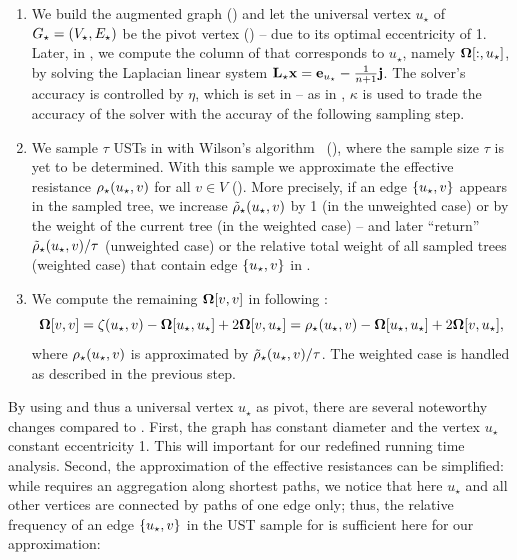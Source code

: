 \begin{enumerate}
\item We build the augmented graph \gstar
    () and let the universal vertex $u_\star$ of
    $G_{\star} = (V_\star, E_\star)$ be the pivot vertex ()
    -- due to its optimal eccentricity of 1. Later, in
    , we compute the column of \Fmat that
    corresponds to $u_\star$, namely $\bm{\Omega}[:, u_\star]$, by solving the
    Laplacian linear system
    $\mathbf{L_{\star}}\mathbf{x} = \mathbf{e}_{u_\star} - \frac{1}{n + 1}\mathbf{j}$.
    The solver's accuracy is controlled by $\eta$, which is set in
     -- as in ,
    $\kappa$ is used to trade the accuracy of the solver with the accuray of
    the following sampling step.

\item We sample $\tau$ USTs in \gstar with Wilson's algorithm~\cite{DBLP:conf/stoc/Wilson96}
    (), where the sample size $\tau$ is yet to be determined.
    With this sample we approximate the effective resistance $\rho_{\star}(u_\star, v)$
    for all $v\in V$
    ().
    More precisely, if an edge $\set{u_\star, v}$ appears in the sampled tree, we increase
    $\tilde{\rho}_{\star}(u_\star, v)$ by 1 (in the unweighted case) or by the weight of the current
    tree (in the weighted case) -- and later \enquote{return}
    $\tilde{\rho}_{\star}(u_\star, v)/\tau$ (unweighted case) or the relative total weight of all
    sampled trees (weighted case) that contain edge $\set{u_\star, v}$ in
    .

\item We compute the remaining $\bm{\Omega}[v,v]$ in
    following :
    \[
    \bm{\Omega}[v, v] = \zeta(u_\star, v) - \bm{\Omega}[u_\star, u_\star] + 2\bm{\Omega}[v, u_\star] =
    \rho_{\star}(u_\star, v) - \bm{\Omega}[u_\star, u_\star] + 2\bm{\Omega}[v, u_\star],
    \]
    where $\rho_{\star}(u_\star, v)$ is approximated by $\tilde{\rho}_{\star}(u_\star, v)/\tau$.
    The weighted case is handled as described in the previous step.
\end{enumerate}



By using \gstar and thus a universal vertex $u_\star$ as pivot, there are several
noteworthy changes compared to . First, the graph \gstar
has constant diameter and the vertex $u_\star$ constant eccentricity 1.
This will important for our redefined running time analysis.
Second, the approximation of the effective resistances can be simplified:
while  requires an aggregation along shortest paths,
we notice that here $u_\star$ and all other vertices are connected by paths
of one edge only; thus, the relative frequency of an edge $\set{u_\star, v}$
in the UST sample for \gstar is sufficient here for our approximation:

